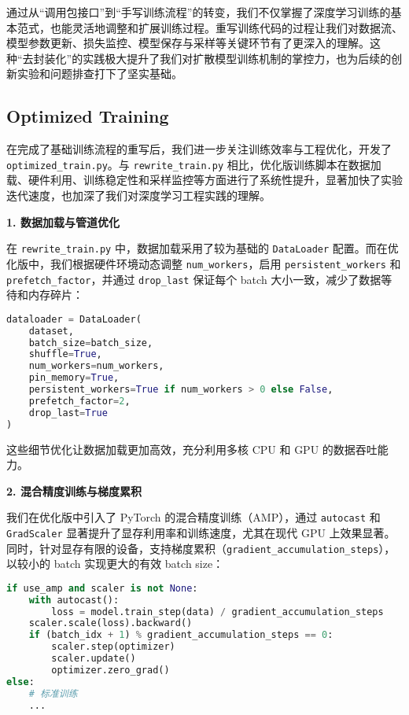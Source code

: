 \documentclass{ctexart}
\begin{document}
通过从“调用包接口”到“手写训练流程”的转变，我们不仅掌握了深度学习训练的基本范式，也能灵活地调整和扩展训练过程。重写训练代码的过程让我们对数据流、模型参数更新、损失监控、模型保存与采样等关键环节有了更深入的理解。这种“去封装化”的实践极大提升了我们对扩散模型训练机制的掌控力，也为后续的创新实验和问题排查打下了坚实基础。


\subsection{Optimized Training}

在完成了基础训练流程的重写后，我们进一步关注训练效率与工程优化，开发了 \texttt{optimized\_train.py}。与 \texttt{rewrite\_train.py} 相比，优化版训练脚本在数据加载、硬件利用、训练稳定性和采样监控等方面进行了系统性提升，显著加快了实验迭代速度，也加深了我们对深度学习工程实践的理解。

\vspace{0.5em}
\noindent
\textbf{1. 数据加载与管道优化}

在 \texttt{rewrite\_train.py} 中，数据加载采用了较为基础的 \texttt{DataLoader} 配置。而在优化版中，我们根据硬件环境动态调整 \texttt{num\_workers}，启用 \texttt{persistent\_workers} 和 \texttt{prefetch\_factor}，并通过 \texttt{drop\_last} 保证每个 batch 大小一致，减少了数据等待和内存碎片：

\begin{lstlisting}[language=python]
dataloader = DataLoader(
    dataset,
    batch_size=batch_size,
    shuffle=True,
    num_workers=num_workers,
    pin_memory=True,
    persistent_workers=True if num_workers > 0 else False,
    prefetch_factor=2,
    drop_last=True
)
\end{lstlisting}

这些细节优化让数据加载更加高效，充分利用多核 CPU 和 GPU 的数据吞吐能力。

\vspace{0.5em}
\noindent
\textbf{2. 混合精度训练与梯度累积}

我们在优化版中引入了 PyTorch 的混合精度训练（AMP），通过 \texttt{autocast} 和 \texttt{GradScaler} 显著提升了显存利用率和训练速度，尤其在现代 GPU 上效果显著。同时，针对显存有限的设备，支持梯度累积（\texttt{gradient\_accumulation\_steps}），以较小的 batch 实现更大的有效 batch size：

\begin{lstlisting}[language=python]
if use_amp and scaler is not None:
    with autocast():
        loss = model.train_step(data) / gradient_accumulation_steps
    scaler.scale(loss).backward()
    if (batch_idx + 1) % gradient_accumulation_steps == 0:
        scaler.step(optimizer)
        scaler.update()
        optimizer.zero_grad()
else:
    # 标准训练
    ...
\end{lstlisting}
\end{document}
